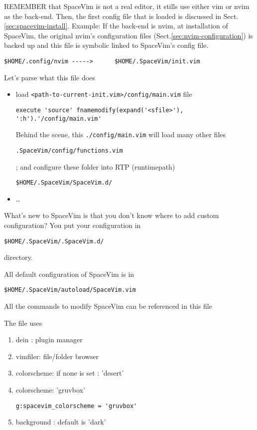 REMEMBER that SpaceVim is not a real editor, it stills use either vim or nvim as
the back-end. Then, the first config file that is loaded is discussed in
Sect.\ref{sec:spacevim-install}. Example: If the back-end is nvim, at
installation of SpaceVim, the original nvim's configuration files
(Sect.\ref{sec:nvim-configuration}) is backed up and this file is symbolic
linked to SpaceVim's config file.
\begin{verbatim}
$HOME/.config/nvim ----->      $HOME/.SpaceVim/init.vim
\end{verbatim}
Let's parse what this file does
\begin{itemize}
  \item load \verb!<path-to-current-init.vim>/config/main.vim! file

\begin{verbatim}
execute 'source' fnamemodify(expand('<sfile>'), ':h').'/config/main.vim'
\end{verbatim}

Behind the scene, this \verb!./config/main.vim! will load many other files
\begin{verbatim}
.SpaceVim/config/functions.vim
\end{verbatim}
; and configure these folder into RTP (runtimepath) 
\begin{verbatim}
$HOME/.SpaceVim/SpaceVim.d/
\end{verbatim}



  \item \ldots 
\end{itemize}

What's new to SpaceVim is that you don't know where to add custom
configuration? You put your configuration in
\begin{verbatim}
$HOME/.SpaceVim/.SpaceVim.d/
\end{verbatim}
directory.

All default configuration of SpaceVim is in 
\begin{verbatim}
$HOME/.SpaceVim/autoload/SpaceVim.vim
\end{verbatim}
All the commands to modify SpaceVim can be referenced in this file

The file uses
\begin{enumerate} 
  \item dein : plugin manager
  \item vimfiler: file/folder browser
  
  \item colorscheme: if none is set : 'desert' 
  \item colorscheme: 'gruvbox'
\begin{verbatim}
g:spacevim_colorscheme = 'gruvbox'
\end{verbatim}
  \item background : default is 'dark'
\end{enumerate}



